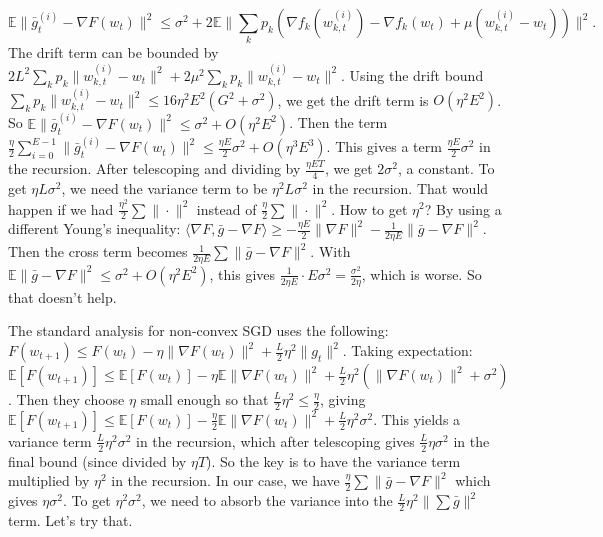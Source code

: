 \documentclass{article}
\begin{document}
\begin{equation}
    \mathbb{E} \| \bar{g}_t^{(i)} - \nabla F(w_t) \|^2 \leq \sigma^2 + 2 \mathbb{E} \| \sum_k p_k (\nabla f_k(w_{k,t}^{(i)}) - \nabla f_k(w_t) + \mu (w_{k,t}^{(i)} - w_t)) \|^2.
\end{equation}
The drift term can be bounded by $2L^2 \sum_k p_k \| w_{k,t}^{(i)} - w_t \|^2 + 2\mu^2 \sum_k p_k \| w_{k,t}^{(i)} - w_t \|^2$. Using the drift bound $\sum_k p_k \| w_{k,t}^{(i)} - w_t \|^2 \leq 16 \eta^2 E^2 (G^2 + \sigma^2)$, we get the drift term is $O(\eta^2 E^2)$. So $\mathbb{E} \| \bar{g}_t^{(i)} - \nabla F(w_t) \|^2 \leq \sigma^2 + O(\eta^2 E^2)$. Then the term $\frac{\eta}{2} \sum_{i=0}^{E-1} \| \bar{g}_t^{(i)} - \nabla F(w_t) \|^2 \leq \frac{\eta E}{2} \sigma^2 + O(\eta^3 E^3)$. This gives a term $\frac{\eta E}{2} \sigma^2$ in the recursion. After telescoping and dividing by $\frac{\eta E T}{4}$, we get $2\sigma^2$, a constant. To get $\eta L \sigma^2$, we need the variance term to be $\eta^2 L \sigma^2$ in the recursion. That would happen if we had $\frac{\eta^2}{2} \sum \| \cdot \|^2$ instead of $\frac{\eta}{2} \sum \| \cdot \|^2$. How to get $\eta^2$? By using a different Young's inequality: $\langle \nabla F, \bar{g} - \nabla F \rangle \geq -\frac{\eta E}{2} \| \nabla F \|^2 - \frac{1}{2\eta E} \| \bar{g} - \nabla F \|^2$. Then the cross term becomes $\frac{1}{2\eta E} \sum \| \bar{g} - \nabla F \|^2$. With $\mathbb{E} \| \bar{g} - \nabla F \|^2 \leq \sigma^2 + O(\eta^2 E^2)$, this gives $\frac{1}{2\eta E} \cdot E \sigma^2 = \frac{\sigma^2}{2\eta}$, which is worse. So that doesn't help.

The standard analysis for non-convex SGD uses the following: $F(w_{t+1}) \leq F(w_t) - \eta \| \nabla F(w_t) \|^2 + \frac{L}{2} \eta^2 \| g_t \|^2$. Taking expectation: $\mathbb{E}[F(w_{t+1})] \leq \mathbb{E}[F(w_t)] - \eta \mathbb{E} \| \nabla F(w_t) \|^2 + \frac{L}{2} \eta^2 (\| \nabla F(w_t) \|^2 + \sigma^2)$. Then they choose $\eta$ small enough so that $\frac{L}{2} \eta^2 \leq \frac{\eta}{2}$, giving $\mathbb{E}[F(w_{t+1})] \leq \mathbb{E}[F(w_t)] - \frac{\eta}{2} \mathbb{E} \| \nabla F(w_t) \|^2 + \frac{L}{2} \eta^2 \sigma^2$. This yields a variance term $\frac{L}{2} \eta^2 \sigma^2$ in the recursion, which after telescoping gives $\frac{L}{2} \eta \sigma^2$ in the final bound (since divided by $\eta T$). So the key is to have the variance term multiplied by $\eta^2$ in the recursion. In our case, we have $\frac{\eta}{2} \sum \| \bar{g} - \nabla F \|^2$ which gives $\eta \sigma^2$. To get $\eta^2 \sigma^2$, we need to absorb the variance into the $\frac{L}{2} \eta^2 \| \sum \bar{g} \|^2$ term. Let's try that.
\end{document}
